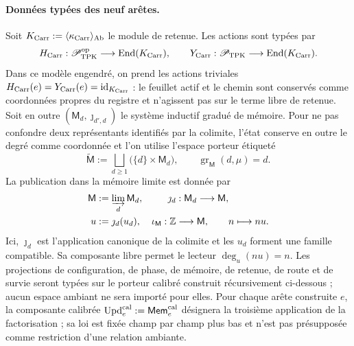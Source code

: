 \paragraph{Données typées des neuf arêtes.}
Soit
\(K_{\rm Carr}:=\langle\kappa_{\rm Carr}\rangle_{\rm Ab}\) le module de
retenue. Les actions sont typées par
\[
 H_{\rm Carr}:\mathscr P_{\rm TPK}^{\rm op}
   \longrightarrow\operatorname{End}(K_{\rm Carr}),\qquad
 Y_{\rm Carr}:\mathscr P_{\rm TPK}
   \longrightarrow\operatorname{End}(K_{\rm Carr}).
\]
Dans ce modèle engendré, on prend les actions triviales \(H_{\rm Carr}(e)=Y_{\rm Carr}(e)=\operatorname{id}_{K_{\rm Carr}}\) : le feuillet actif et le chemin sont conservés comme coordonnées propres du registre et n'agissent pas sur le terme libre de retenue. Soit en outre \((\mathsf M_d,\jmath_{d',d})\) le système inductif gradué de mémoire. Pour ne pas confondre deux représentants identifiés par la colimite, l'état conserve en outre le degré comme coordonnée et l'on utilise l'espace porteur étiqueté
\[
 \widetilde{\mathsf M}:=
 \bigsqcup_{d\ge1}\bigl(\{d\}\times\mathsf M_d\bigr),
 \qquad
 \operatorname{gr}_{\mathsf M}(d,\mu)=d.
\]
La publication dans la mémoire limite est donnée par
\[
\begin{aligned}
 \mathsf M&:=\varinjlim_d\mathsf M_d,&
 \jmath_d&:\mathsf M_d\longrightarrow\mathsf M,\\
 u&:=\jmath_d(u_d),&
 \iota_{\mathsf M}:\mathbb Z&\longrightarrow\mathsf M,
 \qquad n\longmapsto nu .
\end{aligned}
\]
Ici, \(\jmath_d\) est l’application canonique de la colimite et les \(u_d\) forment une
famille compatible. Sa composante libre permet
le lecteur \(\deg_u(nu)=n\).
Les projections de configuration, de phase, de mémoire, de retenue, de route et de
survie seront typées sur le porteur calibré construit
récursivement ci-dessous ; aucun espace ambiant ne sera importé pour elles.
Pour chaque arête construite \(e\), la
composante calibrée
\(\operatorname{Upd}^{\rm cal}_e:=\mathsf{Mem}^{\rm cal}_e\) désignera la
troisième application de la factorisation ; sa loi est fixée champ par champ plus
bas et n’est pas présupposée comme restriction d’une relation ambiante.

